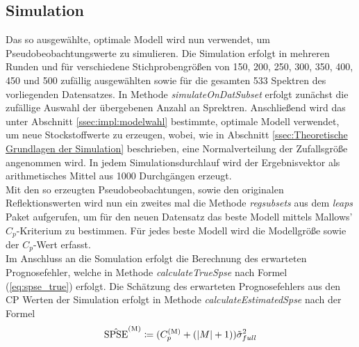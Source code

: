 \subsection{Simulation}
\label{ssec:impl:simulation}
Das so ausgewählte, optimale Modell wird nun verwendet, um Pseudobeobachtungswerte zu simulieren. Die Simulation erfolgt in mehreren Runden und für verschiedene Stichprobengrößen von 150, 200, 250, 300, 350, 400, 450 und 500 zufällig ausgewählten sowie für die gesamten 533 Spektren des vorliegenden Datensatzes. In Methode \textit{simulateOnDatSubset} erfolgt zunächst die zufällige Auswahl der übergebenen Anzahl an Sprektren. Anschließend wird das unter Abschnitt \ref{ssec:impl:modelwahl} bestimmte, optimale Modell verwendet, um neue Stockstoffwerte zu erzeugen, wobei, wie in Abschnitt \ref{ssec:Theoretische Grundlagen der Simulation} beschrieben, eine Normalverteilung der Zufallsgröße angenommen wird. In jedem Simulationsdurchlauf wird der Ergebnisvektor als arithmetisches Mittel aus 1000 Durchgängen erzeugt. \\
Mit den so erzeugten Pseudobeobachtungen, sowie den originalen Reflektionswerten wird nun ein zweites mal die Methode \textit{regsubsets} aus dem \textit{leaps} Paket aufgerufen, um für den neuen Datensatz das beste Modell mittels Mallows' $C_p$-Kriterium zu bestimmen. Für jedes beste Modell wird die Modellgröße sowie der $C_p$-Wert erfasst.\\
Im Anschluss an die Somulation erfolgt die Berechnung des erwarteten Prognosefehler, welche in Methode \textit{calculateTrueSpse} nach Formel (\ref{eq:spse_true}) erfolgt. Die Schätzung des erwarteten Prognosefehlers aus den CP Werten der Simulation erfolgt in Methode \textit{calculateEstimatedSpse} nach der Formel
\[
\hat{\mathrm{SPSE}}^{\mathrm{(M)}} \coloneqq (C_p^{\mathrm{(M)}} + (|M| + 1)) \Tilde{\sigma}^2_{full}
\]
		
